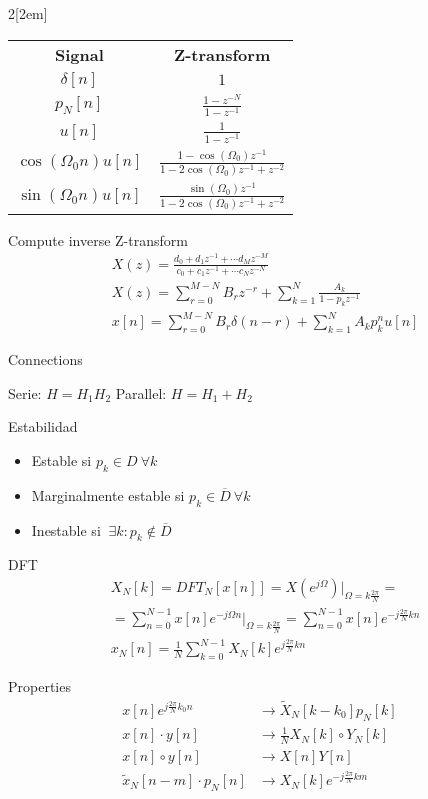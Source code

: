 \documentclass{myclass}
\begin{document}
\begin{multicols}{2}[\columnsep2em]
\begin{center}
\begin{tabular}{cc}
  \textbf{Signal} & \textbf{Z-transform}\\
  $\delta[n]$ & $1$ \\
  $p_N[n]$ &  $\frac{1-z^{-N}}{1-z^{-1}}$ \\
  $u[n]$ &  $\frac{1}{1-z^{-1}}$ \\
  $\cos(\Omega_0n)u[n]$ & $\frac{1-\cos(\Omega_0)z^{-1}}{1-2\cos(\Omega _0)z^{-1}+z^{-2}}$\\
  $\sin(\Omega_0n)u[n]$ & $\frac{\sin(\Omega_0)z^{-1}}{1-2\cos(\Omega _0)z^{-1}+z^{-2}}$
\end{tabular}
\end{center}

Compute inverse Z-transform
\begin{align*}
  & X(z) = \frac{d_0+d_1z^{-1}+\cdots d_Mz^{-M}}{c_0 + c_1z^{-1} + \cdots c_Nz^{-N}} \\
  & X(z) = \sum_{r=0}^{M-N} B_rz^{-r} + \sum_{k=1}^{N} \frac{A_k}{1-p_kz^{-1}}\\
  & x[n] = \sum_{r=0}^{M-N} B_r \delta(n-r) + \sum_{k=1}^{N}A_kp_k^n u[n]
\end{align*}

Connections

Serie: $H = H_1H_2$ \quad Parallel:  $H = H_1+H_2$

Estabilidad
\begin{itemize}[topsep=-6pt, itemsep=0pt]
  \item Estable si $p_k \in D \ \forall k$
  \item Marginalmente estable si $p_k \in \overline{D} \ \forall k$ 
  \item Inestable si $\ \exists k: p_k \not\in \overline{D}$ 
\end{itemize}

DFT
\begin{align*}
  & X_N[k]  = DFT_{N}[x[n]] = X(e^{j\Omega})|_{\Omega = k \frac{2\pi}{N}} =\\
  &= \sum_{n=0}^{N-1}x[n]e^{-j\Omega n} |_{\Omega =k \frac{2\pi}{N}} = \sum_{n=0}^{N-1}x[n]e^{-j \frac{2\pi}{N}kn} \\
  & x_N[n] = \frac{1}{N}\sum_{k=0}^{N-1} X_N[k]e^{j \frac{2\pi}{N}kn}
\end{align*}

Properties
\begin{align*}
  x[n]e^{j \frac{2\pi}{N}k_0n} &\to \tilde{X}_{N}[k-k_0]p_N[k]\\
  x[n]\cdot y[n] &\to \frac{1}{N} X_N[k]\circ Y_N[k]\\
  x[n] \circ y[n] & \to  X[n]Y[n]\\
  \tilde{x}_N[n-m]\cdot p_N[n] &\to X_N[k]e^{-j \frac{2\pi}{N}km}
\end{align*}


\end{multicols}
\end{document}
